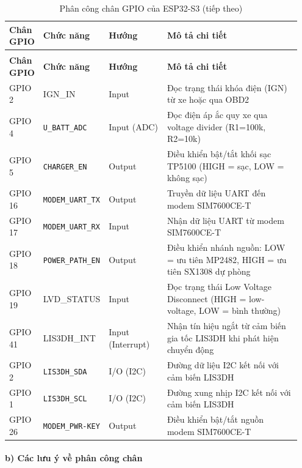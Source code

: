 \documentclass[a4paper]{extarticle}
\newcommand{\thesissettableid}[2]{%
  \renewcommand{\thetable}{#1}%
  \renewcommand{\theHtable}{#2}%
}
\begin{document}
{\thesissettableid{4.1}{tab-ch4-phan-cong-chan-gpio-cua-esp32-s3}
\def\LTcaptype{table}
\begin{longtable}{|L{0.115\linewidth}|L{0.175\linewidth}|L{0.204\linewidth}|L{0.460\linewidth}|}
\caption{Phân công chân GPIO của ESP32-S3}\label{tab:ch4-phan-cong-chan-gpio-cua-esp32-s3}\\
\hline \textbf{Chân GPIO} & \textbf{Chức năng} & \textbf{Hướng} & \textbf{Mô tả chi tiết} \\
\hline
\endfirsthead
\caption[]{Phân công chân GPIO của ESP32-S3 (tiếp theo)}\\
\hline \textbf{Chân GPIO} & \textbf{Chức năng} & \textbf{Hướng} & \textbf{Mô tả chi tiết} \\
\hline
\endhead
\hline
\endfoot
\endlastfoot
GPIO 2 & IGN\_IN & Input & Đọc trạng thái khóa điện (IGN) từ xe hoặc qua
OBD2 \\\hline
GPIO 4 & \nolinkurl{U_BATT_ADC} & Input (ADC) & Đọc điện áp ắc quy xe qua voltage
divider (R1=100k, R2=10k) \\\hline
GPIO 5 & \nolinkurl{CHARGER_EN} & Output & Điều khiển bật/tắt khối sạc TP5100 (HIGH =
sạc, LOW = không sạc) \\\hline
GPIO 16 & \nolinkurl{MODEM_UART_TX} & Output & Truyền dữ liệu UART đến modem
SIM7600CE-T \\\hline
GPIO 17 & \nolinkurl{MODEM_UART_RX} & Input & Nhận dữ liệu UART từ modem
SIM7600CE-T \\\hline
GPIO 18 & \nolinkurl{POWER_PATH_EN} & Output & Điều khiển nhánh nguồn: LOW = ưu
tiên MP2482, HIGH = ưu tiên SX1308 dự phòng \\\hline
GPIO 19 & LVD\_STATUS & Input & Đọc trạng thái Low Voltage Disconnect
(HIGH = low-voltage, LOW = bình thường) \\\hline
GPIO 41 & LIS3DH\_INT & Input (Interrupt) & Nhận tín hiệu ngắt từ cảm
biến gia tốc LIS3DH khi phát hiện chuyển động \\\hline
GPIO 2 & \nolinkurl{LIS3DH_SDA} & I/O (I2C) & Đường dữ liệu I2C kết nối với cảm
biến LIS3DH \\\hline
GPIO 1 & \nolinkurl{LIS3DH_SCL} & I/O (I2C) & Đường xung nhịp I2C kết nối với cảm
biến LIS3DH \\\hline
GPIO 26 & \nolinkurl{MODEM_PWR-KEY} & Output & Điều khiển bật/tắt nguồn modem
SIM7600CE-T \\\hline
\end{longtable}
}


\paragraph{b) Các lưu ý về phân công
chân}\label{b-cuxe1c-lux1b0u-uxfd-vux1ec1-phuxe2n-cuxf4ng-chuxe2n}
\end{document}
